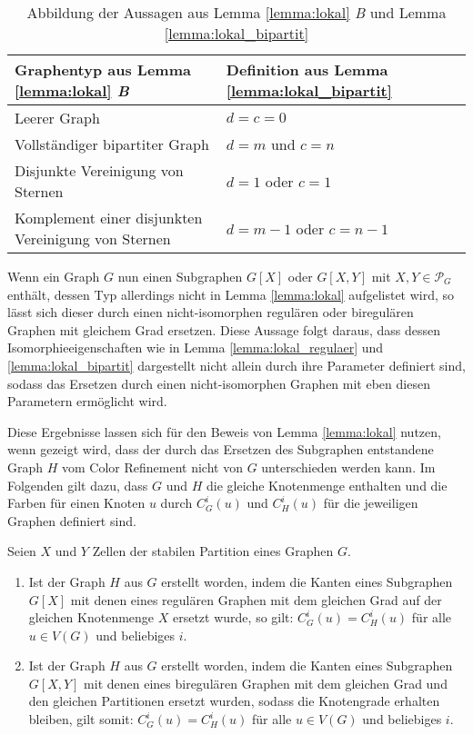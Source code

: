 \begin{table}
	\centering
	\begin{tabular}{|l|l|}
		\hline 
		Graphentyp aus Lemma \ref{lemma:lokal} \emph{B} & Definition aus Lemma \ref{lemma:lokal_bipartit} \\ 
		\hline 
		Leerer Graph & $d=c=0$ \\ 
		\hline 
		Vollständiger bipartiter Graph & $d=m$ und $c=n$ \\ 
		\hline 
		Disjunkte Vereinigung von Sternen & $d=1$ oder $c=1$ \\ 
		\hline 
		Komplement einer disjunkten Vereinigung von Sternen & $d=m-1$ oder $c=n-1$ \\ 
		\hline 
	\end{tabular}
	\caption{Abbildung der Aussagen aus Lemma \ref{lemma:lokal} \emph{B} und Lemma \ref{lemma:lokal_bipartit}}
	\label{tab:mapping_bipartit}
\end{table}

Wenn ein Graph $G$ nun einen Subgraphen $G[X]$ oder $G[X,Y]$ mit $X,Y\in \mathcal{P}_G$ enthält, dessen Typ allerdings nicht in Lemma \ref{lemma:lokal} aufgelistet wird, so lässt sich dieser durch einen nicht-isomorphen regulären oder biregulären Graphen mit gleichem Grad ersetzen. Diese Aussage folgt daraus, dass dessen Isomorphieeigenschaften wie in Lemma \ref{lemma:lokal_regulaer} und \ref{lemma:lokal_bipartit} dargestellt nicht allein durch ihre Parameter definiert sind, sodass das Ersetzen durch einen nicht-isomorphen Graphen mit eben diesen Parametern ermöglicht wird.

Diese Ergebnisse lassen sich für den Beweis von Lemma \ref{lemma:lokal} nutzen, wenn gezeigt wird, dass der durch das Ersetzen des Subgraphen entstandene Graph $H$ vom Color Refinement nicht von $G$ unterschieden werden kann. Im Folgenden gilt dazu, dass $G$ und $H$ die gleiche Knotenmenge enthalten und die Farben für einen Knoten $u$ durch $C^i_G(u)$ und $C^i_H(u)$ für die jeweiligen Graphen definiert sind.

\begin{Lemma}
	Seien $X$ und $Y$ Zellen der stabilen Partition eines Graphen $G$.
	\begin{enumerate}[label=(\alph*)]
		\item  Ist der Graph $H$ aus $G$ erstellt worden, indem die Kanten eines Subgraphen $G[X]$ mit denen eines regulären Graphen mit dem gleichen Grad auf der gleichen Knotenmenge $X$ ersetzt wurde, so gilt: $C^i_G(u)=C^i_H(u)$ für alle $u\in V(G)$ und beliebiges $i$.
		\item Ist der Graph $H$ aus $G$ erstellt worden, indem die Kanten eines Subgraphen $G[X,Y]$ mit denen eines biregulären Graphen mit dem gleichen Grad und den gleichen Partitionen ersetzt wurden, sodass die Knotengrade erhalten bleiben, gilt somit: $C^i_G(u)=C^i_H(u)$ für alle $u\in V(G)$ und beliebiges $i$.
	\end{enumerate}
	\label{lemma:lokal_nicht_unterscheidbar}
\end{Lemma}

